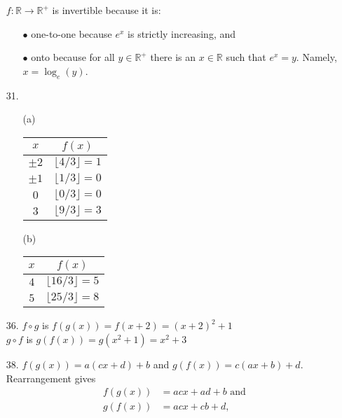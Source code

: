 \documentclass{article}
\begin{document}
\begin{enumerate}
                $f : \mathbb{R} \to \mathbb{R}^+$ is invertible because it is:
                \begin{itemize}
                    \item[$\bullet$] one-to-one because $e^x$ is strictly increasing, and
                    \item[$\bullet$] onto because for all $y \in \mathbb{R}^+$ there is an $x \in \mathbb{R}$ such that $e^x = y$. Namely, $x = \log_{e}(y)$.
                \end{itemize}
    \item[31.]
        \begin{itemize}
            \item[(a)] 
            \begin{flushleft}
                \begin{tabular}{c|c}
                $x$ & $f(x)$ \\\hline
                $\pm 2$ & $\lfloor 4/3 \rfloor = 1$\\
                $\pm 1$ & $\lfloor 1/3 \rfloor = 0$\\
                $0$ & $\lfloor 0/3 \rfloor = 0$\\
                $3$ & $\lfloor 9/3 \rfloor = 3$
                \end{tabular}
            \end{flushleft}
            \item[(b)] 
            \begin{flushleft}
                \begin{tabular}{c|c}
                $x$ & $f(x)$ \\\hline
                $4$ & $\lfloor 16/3 \rfloor = 5$\\
                $5$ & $\lfloor 25/3 \rfloor = 8$
                \end{tabular}
            \end{flushleft}
        \end{itemize}
    \item[36.] $f \circ g$ is $f(g(x)) = f(x+2) = (x+2)^2 + 1$\\
                $g \circ f$ is $g(f(x)) = g(x^2+1) = x^2 + 3$
    \item[38.] $f(g(x)) = a(cx+d)+b$ and $g(f(x)) = c(ax+b)+d$. Rearrangement gives
        \begin{align*}
        f(g(x)) &= acx + ad + b \textrm{ and} \\
        g(f(x)) &= acx + cb + d,

\end{align*}
\end{enumerate}
\end{document}
